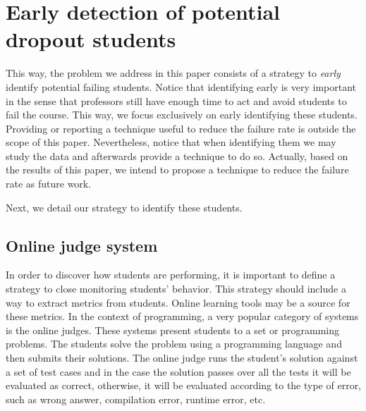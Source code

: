 \section{Early detection of potential dropout students}

\label{sec:strategy}

This way, the problem we address in this paper consists of a strategy to \textit{early} identify potential failing students. Notice that identifying early is very important in the sense that professors still have enough time to act and avoid students to fail the course. This way, we focus exclusively on early identifying these students. Providing or reporting a technique useful to reduce the failure rate is outside the scope of this paper. Nevertheless, notice that when identifying them we may study the data and afterwards provide a technique to do so. Actually, based on the results of this paper, we intend to propose a technique to reduce the failure rate as future work.

Next, we detail our strategy to identify these students.

\subsection{Online judge system}
In order to discover how students are performing, it is important to define a strategy to close monitoring students’ behavior. This strategy should include a way to extract metrics from students. Online learning tools may be a source for these metrics. In the context of programming, a very popular category of systems is the online judges. These systems present students to a set or programming problems. The students solve the problem using a programming language and then submits their solutions. The online judge runs the student’s solution against a set of test cases and in the case the solution passes over all the tests it will be evaluated as correct, otherwise, it will be evaluated according to the type of error, such as wrong answer, compilation error, runtime error, etc.

